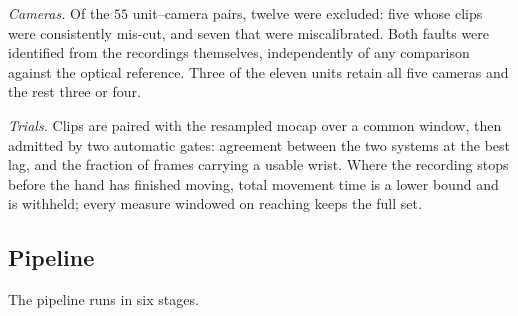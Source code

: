 \documentclass[conference]{IEEEtran}
\begin{document}
\emph{Cameras.} Of the $55$ unit--camera pairs, twelve were excluded: five
whose clips were consistently mis-cut, and seven that were miscalibrated. Both
faults were identified from the recordings themselves, independently of any
comparison against the optical reference. Three of the eleven units retain all
five cameras and the rest three or four.

\emph{Trials.} Clips are paired with the resampled mocap over a common window,
then admitted by two automatic gates: agreement between the two systems at the best
lag, and the fraction of frames carrying a usable wrist. Where the
recording stops before the hand has finished moving, total movement time is a
lower bound and is withheld; every measure windowed on reaching keeps the full
set.

\subsection{Pipeline}
\label{sec:pipeline}
The pipeline runs in six stages.
\end{document}

